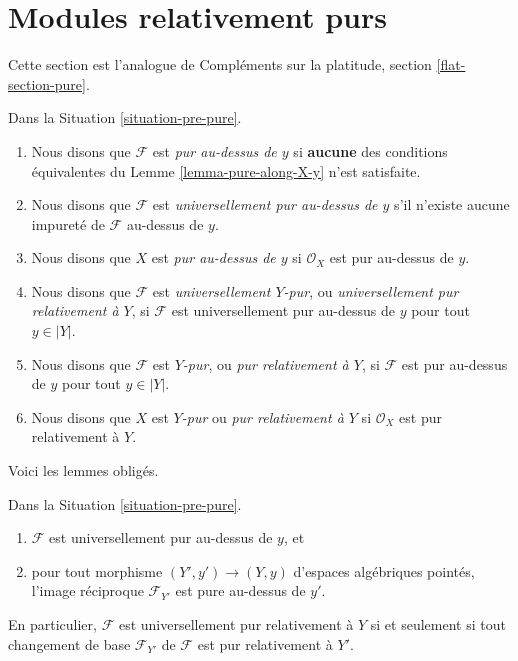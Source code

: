 \section{Modules relativement purs}
\label{section-pure}

\noindent
Cette section est l'analogue de
Compléments sur la platitude, section \ref{flat-section-pure}.

\begin{definition}
\label{definition-pure}
Dans la Situation \ref{situation-pre-pure}.
\begin{enumerate}
\item Nous disons que $\mathcal{F}$ est {\it pur au-dessus de $y$} si {\bf aucune} des
conditions équivalentes du Lemme \ref{lemma-pure-along-X-y} n'est satisfaite.
\item Nous disons que $\mathcal{F}$ est {\it universellement pur au-dessus de $y$}
s'il n'existe aucune impureté de $\mathcal{F}$ au-dessus de $y$.
\item Nous disons que $X$ est {\it pur au-dessus de $y$} si $\mathcal{O}_X$
est pur au-dessus de $y$.
\item Nous disons que $\mathcal{F}$ est {\it universellement $Y$-pur}, ou
{\it universellement pur relativement à $Y$}, si $\mathcal{F}$ est universellement
pur au-dessus de $y$ pour tout $y \in |Y|$.
\item Nous disons que $\mathcal{F}$ est {\it $Y$-pur}, ou
{\it pur relativement à $Y$}, si $\mathcal{F}$ est pur au-dessus de $y$
pour tout $y \in |Y|$.
\item Nous disons que $X$ est {\it $Y$-pur} ou {\it pur relativement à $Y$}
si $\mathcal{O}_X$ est pur relativement à $Y$.
\end{enumerate}
\end{definition}

\noindent
Voici les lemmes obligés.

\begin{lemma}
\label{lemma-base-change-universally}
Dans la Situation \ref{situation-pre-pure}.
\begin{enumerate}
\item $\mathcal{F}$ est universellement pur au-dessus de $y$, et
\item pour tout morphisme $(Y', y') \to (Y, y)$ d'espaces algébriques pointés,
l'image réciproque $\mathcal{F}_{Y'}$ est pure au-dessus de $y'$.
\end{enumerate}
En particulier, $\mathcal{F}$ est universellement pur relativement à $Y$ si et
seulement si tout changement de base $\mathcal{F}_{Y'}$ de $\mathcal{F}$ est
pur relativement à $Y'$.
\end{lemma}

